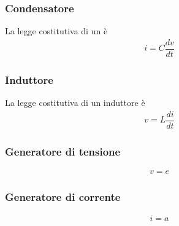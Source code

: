 \documentclass[letterpaper,10pt,italian]{jupyterBook}
\begin{document}
\subsubsection{Condensatore}
\label{\detokenize{ch/electromagnetism/circuits-electric:condensatore}}\label{\detokenize{ch/electromagnetism/circuits-electric:physics-hs-electromagnetism-circuits-electric-components-capacitor}}
\sphinxAtStartPar
La legge costitutiva di un {\hyperref[\detokenize{ch/electromagnetism/electrostatics:physics-hs-electromagnetism-electrostatics-capacitor}]{}} è
\begin{equation*}
\begin{split}i = C \dfrac{d v}{dt}\end{split}
\end{equation*}

\subsubsection{Induttore}
\label{\detokenize{ch/electromagnetism/circuits-electric:induttore}}\label{\detokenize{ch/electromagnetism/circuits-electric:physics-hs-electromagnetism-circuits-electric-components-inductor}}
\sphinxAtStartPar
La legge costitutiva di un induttore è
\begin{equation*}
\begin{split}v = L \dfrac{d i}{dt}\end{split}
\end{equation*}

\subsubsection{Generatore di tensione}
\label{\detokenize{ch/electromagnetism/circuits-electric:generatore-di-tensione}}\label{\detokenize{ch/electromagnetism/circuits-electric:physics-hs-electromagnetism-circuits-electric-components-generator-v}}\begin{equation*}
\begin{split}v = e\end{split}
\end{equation*}

\subsubsection{Generatore di corrente}
\label{\detokenize{ch/electromagnetism/circuits-electric:generatore-di-corrente}}\label{\detokenize{ch/electromagnetism/circuits-electric:physics-hs-electromagnetism-circuits-electric-components-generator-i}}\begin{equation*}
\begin{split}i = a\end{split}
\end{equation*}
\end{document}
